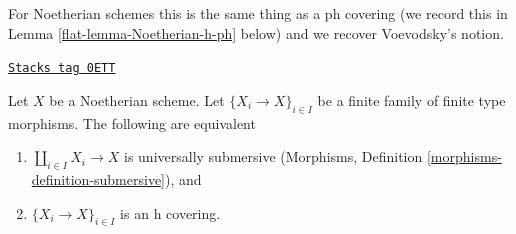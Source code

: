 For Noetherian schemes this is the same thing as a ph covering
(we record this in Lemma \ref{flat-lemma-Noetherian-h-ph} below) and
we recover Voevodsky's notion.

\begin{lemma}
\label{flat-lemma-Noetherian-h-covering}
\href{https://stacks.math.columbia.edu/tag/0ETT}{\texttt{Stacks tag 0ETT}}

Let $X$ be a Noetherian scheme. Let $\{X_i \to X\}_{i \in I}$
be a finite family of finite type morphisms. The following are equivalent
\begin{enumerate}
\item $\coprod_{i \in I} X_i \to X$ is universally submersive
(Morphisms, Definition
\ref{morphisms-definition-submersive}), and
\item $\{X_i \to X\}_{i \in I}$ is an h covering.
\end{enumerate}
\end{lemma}

